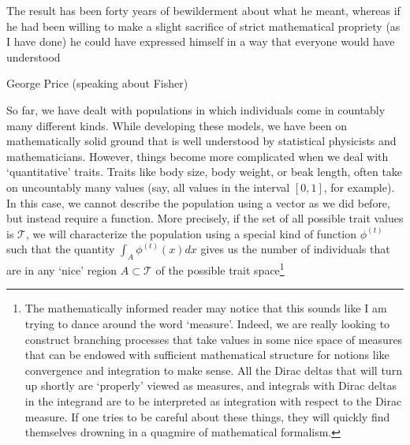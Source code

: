\epigraph{\justifying The result has been forty years of bewilderment about what he meant, whereas if he had been willing to make a slight sacrifice of strict mathematical propriety (as I have done) he could have expressed himself in a way that everyone would have understood}{George Price (speaking about Fisher)}


So far, we have dealt with populations in which individuals come in countably many different kinds. While developing these models, we have been on mathematically solid ground that is well understood by statistical physicists and mathematicians. However, things become more complicated when we deal with `quantitative' traits. Traits like body size, body weight, or beak length, often take on uncountably many values (say, all values in the interval $[0,1]$, for example). In this case, we cannot describe the population using a vector as we did before, but instead require a function. More precisely, if the set of all possible trait values is $\mathcal{T}$, we will characterize the population using a special kind of function $\phi^{(t)}$ such that the quantity $\int_{A}\phi^{(t)}(x)dx$ gives us the number of individuals that are in any `nice' region $A \subset \mathcal{T}$ of the possible trait space\footnote{The mathematically informed reader may notice that this sounds like I am trying to dance around the word `measure'. Indeed, we are really looking to construct branching processes that take values in some nice space of measures that can be endowed with 
sufficient mathematical structure for notions like convergence and integration to make sense. All the Dirac deltas that will turn up shortly are `properly' viewed as measures, and integrals with Dirac deltas in the integrand are to be interpreted as integration with respect to the Dirac measure. If one tries to be careful about these things, they will quickly find themselves drowning in a quagmire of mathematical formalism.
}
